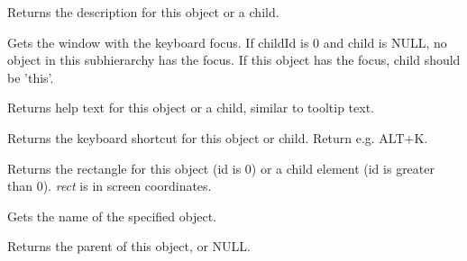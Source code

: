\label{wxaccessiblegetdescription}


Returns the description for this object or a child.

\label{wxaccessiblegetfocus}


Gets the window with the keyboard focus. If childId is 0 and child is NULL, no object in
this subhierarchy has the focus. If this object has the focus, child should be 'this'.

\label{wxaccessiblegethelptext}


Returns help text for this object or a child, similar to tooltip text.

\label{wxaccessiblegetkeyboardshortcut}


Returns the keyboard shortcut for this object or child.
Return e.g. ALT+K.

\label{wxaccessiblegetlocation}


Returns the rectangle for this object (id is 0) or a child element (id is greater than 0).
{\it rect} is in screen coordinates.

\label{wxaccessiblegetname}


Gets the name of the specified object.

\label{wxaccessiblegetparent}


Returns the parent of this object, or NULL.

\label{wxaccessiblegetrole}

